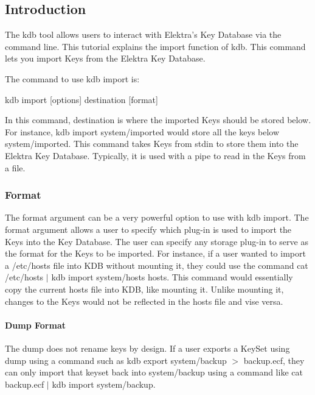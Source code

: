 \subsection*{Introduction}

The kdb tool allows users to interact with Elektra’s Key Database via the command line. This tutorial explains the import function of kdb. This command lets you import Keys from the Elektra Key Database.

The command to use kdb import is\+:


\begin{DoxyCode}
kdb import [options] destination [format]
\end{DoxyCode}


In this command, {\ttfamily destination} is where the imported Keys should be stored below. For instance, {\ttfamily kdb import system/imported} would store all the keys below {\ttfamily system/imported}. This command takes Keys from {\ttfamily stdin} to store them into the Elektra Key Database. Typically, it is used with a pipe to read in the Keys from a file.

\subsubsection*{Format}

The format argument can be a very powerful option to use with kdb import. The format argument allows a user to specify which plug-\/in is used to import the Keys into the Key Database. The user can specify any storage plug-\/in to serve as the format for the Keys to be imported. For instance, if a user wanted to import a {\ttfamily /etc/hosts} file into K\+DB without mounting it, they could use the command {\ttfamily cat /etc/hosts $\vert$ kdb import system/hosts hosts}. This command would essentially copy the current hosts file into K\+DB, like mounting it. Unlike mounting it, changes to the Keys would not be reflected in the hosts file and vise versa.

\paragraph*{Dump Format}

The dump does not rename keys by design. If a user exports a Key\+Set using dump using a command such as {\ttfamily kdb export system/backup $>$ backup.\+ecf}, they can only import that keyset back into {\ttfamily system/backup} using a command like {\ttfamily cat backup.\+ecf $\vert$ kdb import system/backup}.

